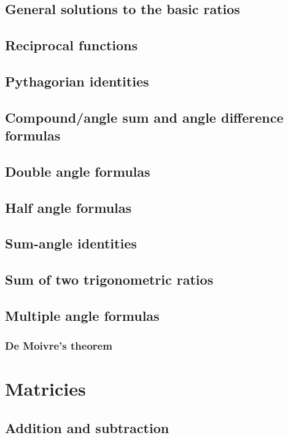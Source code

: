 \documentclass{book}
\begin{document}
\section{General solutions to the basic ratios}

\section{Reciprocal functions}

\section{Pythagorian identities}

\section{Compound/angle sum and angle difference formulas}

\section{Double angle formulas}

\section{Half angle formulas}

\section{Sum-angle identities}

\section{Sum of two trigonometric ratios}

\section{Multiple angle formulas}
\subsection{De Moivre's theorem}

\chapter{Matricies}
\section{Addition and subtraction}
\end{document}
